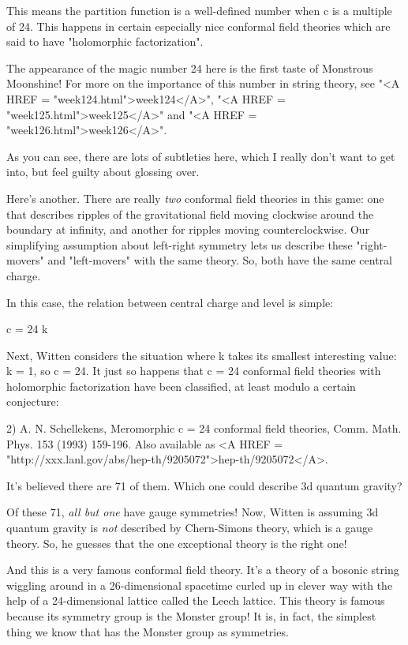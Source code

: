 This means the partition function is a well-defined number when 
c is a multiple of 24.  This happens in certain especially nice 
conformal field theories which are said to have "holomorphic 
factorization".

The appearance of the magic number 24 here is the first taste of
Monstrous Moonshine!  For more on the importance of this number in
string theory, see "<A HREF = "week124.html">week124</A>",
"<A HREF = "week125.html">week125</A>" and "<A HREF =
"week126.html">week126</A>".

As you can see, there are lots of subtleties here, which I really 
don't want to get into, but feel guilty about glossing over.

Here's another.  There are really \emph{two} conformal field
theories in this game: one that describes ripples of the gravitational
field moving clockwise around the boundary at infinity, and another
for ripples moving counterclockwise.  Our simplifying assumption
about left-right symmetry lets us describe these
"right-movers" and "left-movers" with the same
theory.  So, both have the same central charge.

In this case, the relation between central charge and level 
is simple:

c = 24 k

Next, Witten considers the situation where k takes its smallest 
interesting value: k = 1, so c = 24.  It just so happens that 
c = 24 conformal field theories with holomorphic factorization 
have been classified, at least modulo a certain conjecture: 

2) A. N. Schellekens, Meromorphic c = 24 conformal field theories, 
Comm. Math. Phys. 153 (1993) 159-196.  Also available as 
<A HREF = "http://xxx.lanl.gov/abs/hep-th/9205072">hep-th/9205072</A>.

It's believed there are 71 of them.  Which one could describe 
3d quantum gravity?  

Of these 71, \emph{all but one} have gauge symmetries!  Now, Witten 
is assuming 3d quantum gravity is \emph{not} described by Chern-Simons 
theory, which is a gauge theory.  So, he guesses that the one 
exceptional theory is the right one!

And this is a very famous conformal field theory.  It's a theory 
of a bosonic string wiggling around in a 26-dimensional spacetime 
curled up in clever way with the help of a 24-dimensional lattice 
called the Leech lattice.  This theory is famous because its 
symmetry group is the Monster group!  It is, in fact, the simplest 
thing we know that has the Monster group as symmetries.  

